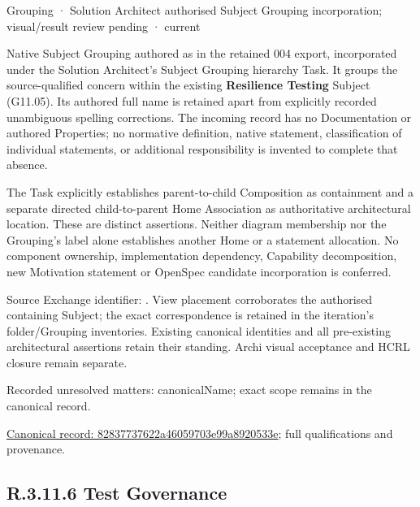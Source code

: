 \label{element:82837737622a46059703e99a8920533e}
{\small Grouping · Solution Architect authorised Subject Grouping incorporation; visual/result review pending · current}\par

Native Subject Grouping authored as \texttt{} in the retained 004 export,
incorporated under the Solution Architect's Subject Grouping hierarchy Task.
It groups the source-qualified \texttt{} concern within
the existing \textbf{Resilience Testing} Subject (G11.05). Its authored full name
is retained apart from explicitly recorded unambiguous spelling corrections.
The incoming record has no Documentation or authored Properties; no normative
definition, native statement, classification of individual statements, or
additional responsibility is invented to complete that absence.



The Task explicitly establishes parent-to-child Composition as containment and
a separate directed child-to-parent Home Association as authoritative architectural
location. These are distinct assertions. Neither diagram membership nor the
Grouping's label alone establishes another Home or a statement allocation.
No component ownership, implementation dependency, Capability decomposition,
new Motivation statement or OpenSpec candidate incorporation is conferred.



Source Exchange identifier: \texttt{}. View placement corroborates
the authorised containing Subject; the exact correspondence is retained in the
iteration's folder/Grouping inventories. Existing canonical identities and all
pre-existing architectural assertions retain their standing. Archi visual
acceptance and HCRL closure remain separate.


{\small Recorded unresolved matters: canonicalName; exact scope remains in the canonical record.}\par
{\footnotesize \href{../../../../continuum/grouping/82837737622a46059703e99a8920533e.md}{Canonical record: 82837737622a46059703e99a8920533e}; full qualifications and provenance.}\par
\subsection*{R.3.11.6 Test Governance}
\label{navigation:R.3.11.6}

